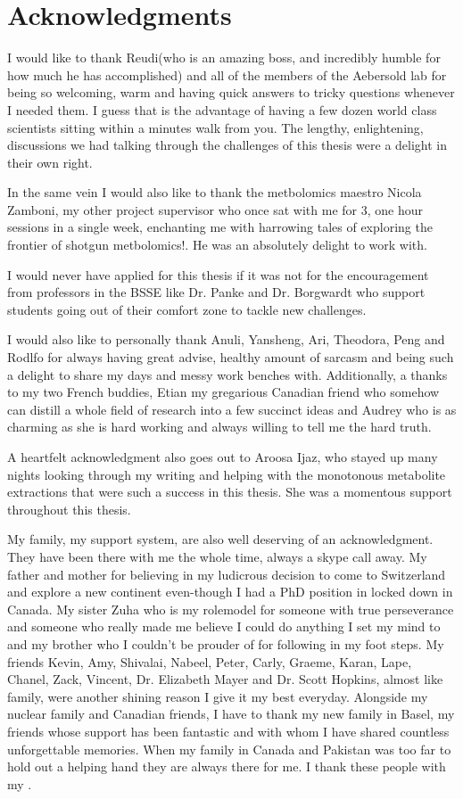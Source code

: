 \documentclass[a4paper]{book}
\begin{document}
\section{Acknowledgments}
I would like to thank Reudi(who is an amazing boss, and incredibly humble for how much he has accomplished) and all of the members of the Aebersold lab for being so welcoming, warm and having quick answers to tricky questions whenever I needed them. I guess that is the advantage of having a few dozen world class scientists sitting within a minutes walk from you. The lengthy, enlightening, discussions we had talking through the challenges of this thesis were a delight in their own right. 

In the same vein I would also like to thank the metbolomics maestro Nicola Zamboni, my other project supervisor who once sat with me for 3, one hour sessions in a single week, enchanting me with harrowing tales of exploring the frontier of shotgun metbolomics!. He was an absolutely delight to work with.

I would never have applied for this thesis if it was not for the encouragement from professors in the BSSE like Dr. Panke and Dr. Borgwardt who support students going out of their comfort zone to tackle new challenges.

I would also like to personally thank Anuli, Yansheng, Ari, Theodora, Peng and Rodlfo for always having great advise, healthy amount of sarcasm and being such a delight to share my days and messy work benches with. Additionally, a thanks to my two French buddies, Etian my gregarious Canadian friend who somehow can distill a whole field of research into a few succinct ideas and Audrey who is as charming as she is hard working and always willing to tell me the hard truth. 

A heartfelt acknowledgment also goes out to Aroosa Ijaz, who stayed up many nights looking through my writing and helping with the monotonous metabolite extractions that were such a success in this thesis.  She was a momentous support throughout this thesis.

My family, my support system, are also well deserving of an acknowledgment. They have been there with me the whole time, always a skype call away. My father and mother for believing in my ludicrous decision to come to Switzerland and explore a new continent even-though I had a PhD position in locked down in Canada. My sister Zuha who is my rolemodel for someone with true perseverance and someone who really made me believe I could do anything I set my mind to and my brother who I couldn't be prouder of for following in my foot steps. My friends Kevin, Amy, Shivalai, Nabeel, Peter, Carly, Graeme, Karan, Lape, Chanel, Zack, Vincent, Dr. Elizabeth Mayer and Dr. Scott Hopkins, almost like family, were another shining reason I give it my best everyday.  Alongside my nuclear family and Canadian friends, I have to thank my new family in Basel, my friends whose support has been fantastic and with whom I have shared countless unforgettable memories. When my family in Canada and Pakistan was too far to hold out a helping hand they are always there for me. I thank these people with my .
\end{document}
